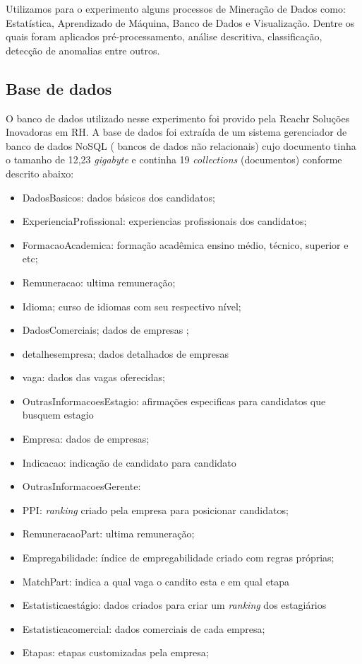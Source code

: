 \documentclass[conference]{IEEEtran}
\begin{document}
    Utilizamos para o experimento alguns processos de Mineração de Dados como: Estatística, Aprendizado de Máquina, Banco de Dados e Visualização. Dentre os quais foram aplicados pré-processamento, análise descritiva, classificação, detecção de anomalias entre outros.

    \subsection{Base de dados}

 O banco de dados utilizado nesse experimento foi provido pela Reachr Soluções Inovadoras em RH.
A base de dados foi extraída de um sistema gerenciador de banco de dados NoSQL ( bancos de dados não relacionais) cujo documento tinha o tamanho de 12,23 \textit{gigabyte} e continha 19 \textit{collections} (documentos) conforme descrito abaixo:

\begin{itemize}
\item DadosBasicos: dados básicos dos candidatos;
\item ExperienciaProfissional: experiencias profissionais dos candidatos;
\item FormacaoAcademica: formação acadêmica ensino médio, técnico, superior e etc;
\item Remuneracao: ultima remuneração;
\item Idioma; curso de idiomas com seu respectivo nível;
\item DadosComerciais; dados de empresas ;
\item detalhesempresa; dados detalhados de empresas
\item vaga: dados das vagas oferecidas;
\item OutrasInformacoesEstagio: afirmações especificas para candidatos que busquem estagio
\item Empresa: dados de empresas;
\item Indicacao: indicação de candidato para candidato
\item OutrasInformacoesGerente: 
\item PPI: \textit{ranking} criado pela empresa para posicionar candidatos;
\item RemuneracaoPart: ultima remuneração;
\item Empregabilidade: índice de empregabilidade criado com regras próprias;
\item MatchPart: indica a qual vaga o candito esta e em qual etapa
\item Estatisticaestágio: dados criados para criar um \textit{ranking} dos estagiários
\item Estatisticacomercial: dados comerciais de cada empresa;
\item Etapas: etapas customizadas pela empresa;
\end{itemize}
\end{document}
